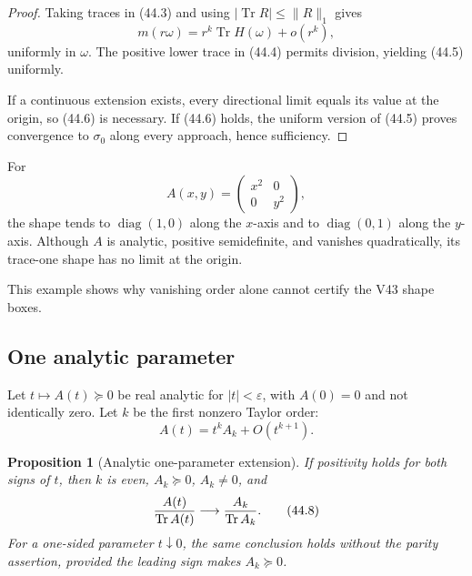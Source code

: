 \documentclass[11pt]{article}
\newtheorem{proposition}[theorem]{Proposition}
\theoremstyle{remark}
\begin{document}
\begin{proof}
Taking traces in (44.3) and using
\(|\operatorname{Tr}R|\leq\|R\|_1\) gives
\[
 m(r\omega)
 =
 r^k\operatorname{Tr}H(\omega)+o(r^k),
\]
uniformly in \(\omega\).  The positive lower trace in (44.4) permits
division, yielding (44.5) uniformly.

If a continuous extension exists, every directional limit equals
its value at the origin, so (44.6) is necessary.  If (44.6) holds,
the uniform version of (44.5) proves convergence to \(\sigma_0\)
along every approach, hence sufficiency.
\end{proof}

\begin{example}
\label{ex:v12v44-direction-failure}
For
\[
 A(x,y)=
 \begin{pmatrix}x^2&0\\0&y^2\end{pmatrix},
\]
the shape tends to
\(\operatorname{diag}(1,0)\) along the \(x\)-axis and to
\(\operatorname{diag}(0,1)\) along the \(y\)-axis.  Although \(A\)
is analytic, positive semidefinite, and vanishes quadratically, its
trace-one shape has no limit at the origin.
\end{example}

This example shows why vanishing order alone cannot certify the V43
shape boxes.

\subsection{One analytic parameter}

Let \(t\mapsto A(t)\succeq0\) be real analytic for
\(|t|<\varepsilon\), with \(A(0)=0\) and not identically zero.
Let \(k\) be the first nonzero Taylor order:
\begin{equation}
 A(t)=t^kA_k+O(t^{k+1}).                          \tag{44.7}
\end{equation}

\begin{proposition}[Analytic one-parameter extension]
\label{prop:v12v44-analytic}
If positivity holds for both signs of \(t\), then \(k\) is even,
\(A_k\succeq0\), \(A_k\ne0\), and
\begin{equation}
 {A(t)\over\operatorname{Tr}A(t)}
 \longrightarrow
 {A_k\over\operatorname{Tr}A_k}.                 \tag{44.8}
\end{equation}
For a one-sided parameter \(t\downarrow0\), the same conclusion
holds without the parity assertion, provided the leading sign makes
\(A_k\succeq0\).
\end{proposition}
\end{document}

